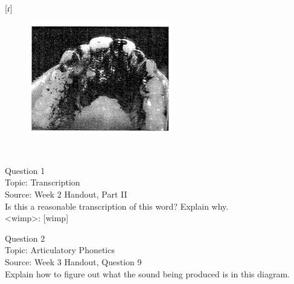 \documentclass[12pt]{article}
\begin{document}
{[ɾ]}

\begin{figure}[H]
\includegraphics{../images/staticpalatography_stop.png}
\end{figure}

\newpage

\begin{center}
\textbf{{\color{red}{\HUGE END OF EXAM}}}\\

\end{center}
\newpage

\begin{center}
\textbf{{\color{blue}{\HUGE START OF EXAM\\}}}

\textbf{{\color{blue}{\HUGE Student ID: 83324\\}}}

\textbf{{\color{blue}{\HUGE 4:40\\}}}

\end{center}
\newpage

{\large Question 1}\\

Topic: Transcription\\
Source: Week 2 Handout, Part II\\

Is this a reasonable transcription of this word? Explain why.\\

<wimp>: {[wimp]}


\newpage

{\large Question 2}\\

Topic: Articulatory Phonetics\\
Source: Week 3 Handout, Question 9\\

Explain how to figure out what the sound being produced is in this diagram.\\
\end{document}
